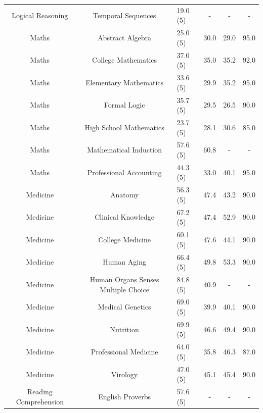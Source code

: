 \documentclass[11pt, a4paper, logo, internal, copyright, nonumbering]{deepmind}
\begin{document}
\begin{center}
\begin{longtable}{cclccc}
      Logical Reasoning &                    Temporal Sequences &   19.0 (5) &   - &   - &          - \\
                  Maths &                     Abstract Algebra &   25.0 (5) &  30.0 &  29.0 &         95.0 \\
                  Maths &                  College Mathematics &   37.0 (5) &  35.0 &  35.2 &         92.0 \\
                  Maths &               Elementary Mathematics &   33.6 (5) &  29.9 &  35.2 &         95.0 \\
                  Maths &                         Formal Logic &   35.7 (5) &  29.5 &  26.5 &         90.0 \\
                  Maths &              High School Mathematics &   23.7 (5) &  28.1 &  30.6 &         85.0 \\
                  Maths &                Mathematical Induction &   57.6 (5) &  60.8 &   - &          - \\
                  Maths &              Professional Accounting &   44.3 (5) &  33.0 &  40.1 &         95.0 \\
               Medicine &                              Anatomy &   56.3 (5) &  47.4 &  43.2 &         90.0 \\
               Medicine &                   Clinical Knowledge &   67.2 (5) &  47.4 &  52.9 &         90.0 \\
               Medicine &                     College Medicine &   60.1 (5) &  47.6 &  44.1 &         90.0 \\
               Medicine &                          Human Aging &   66.4 (5) &  49.8 &  53.3 &         90.0 \\
               Medicine &   Human Organs Senses Multiple Choice &   84.8 (5) &  40.9 &   - &          - \\
               Medicine &                     Medical Genetics &   69.0 (5) &  39.9 &  40.1 &         90.0 \\
               Medicine &                            Nutrition &   69.9 (5) &  46.6 &  49.4 &         90.0 \\
               Medicine &                Professional Medicine &   64.0 (5) &  35.8 &  46.3 &         87.0 \\
               Medicine &                             Virology &   47.0 (5) &  45.1 &  45.4 &         90.0 \\
  Reading Comprehension &                      English Proverbs &   57.6 (5) &   - &   - &          - \\

\end{longtable}
\end{center}
\end{document}
